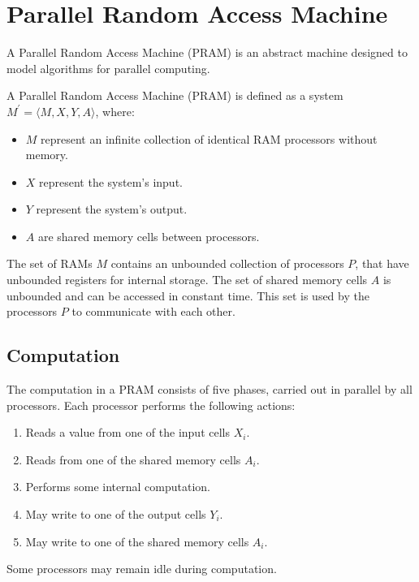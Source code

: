 \section{Parallel Random Access Machine}

A Parallel Random Access Machine (PRAM) is an abstract machine designed to model algorithms for parallel computing. 
\begin{definition}
    A Parallel Random Access Machine (PRAM) is defined as a system $M^\prime = \langle M, X, Y, A \rangle$, where:
\end{definition}
\begin{itemize}
    \item $M$ represent an infinite collection of identical RAM processors without memory. 
    \item $X$ represent the system's input.
    \item $Y$ represent the system's output.
    \item $A$ are shared memory cells between processors.
\end{itemize}
The set of RAMs $M$ contains an unbounded collection of processors $P$, that have unbounded registers for internal storage. 
The set of shared memory cells $A$ is unbounded and can be accessed in constant time.
This set is used by the processors $P$ to communicate with each other. 

\subsection{Computation}
The computation in a PRAM consists of five phases, carried out in parallel by all processors. 
Each processor performs the following actions:
\begin{enumerate}
    \item Reads a value from one of the input cells $X_i$.
    \item Reads from one of the shared memory cells $A_i$.
    \item Performs some internal computation.
    \item May write to one of the output cells $Y_i$.
    \item May write to one of the shared memory cells $A_i$.
\end{enumerate}
Some processors may remain idle during computation. 

